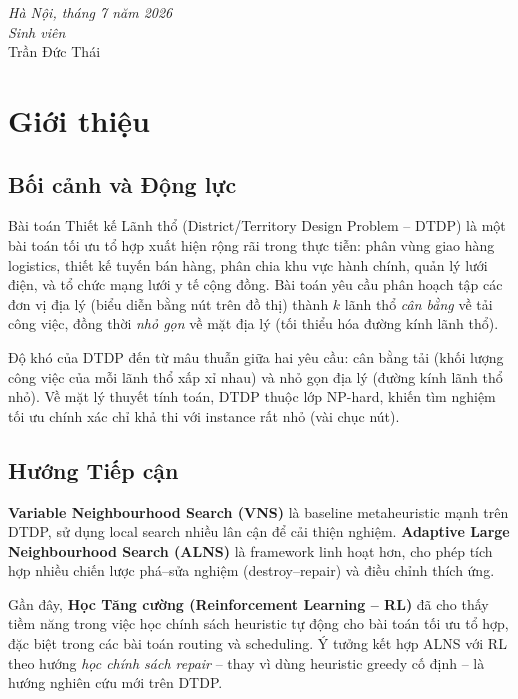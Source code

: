\documentclass[12pt, a4paper]{article}
\begin{document}
\vspace{1cm}
\begin{flushright}
  \textit{Hà Nội, tháng 7 năm 2026}\\[0.3cm]
  \textit{Sinh viên}\\[0.5cm]
  Trần Đức Thái
\end{flushright}

\newpage
\tableofcontents
\newpage

\section{Giới thiệu}
\label{sec:intro}

\subsection{Bối cảnh và Động lực}

Bài toán Thiết kế Lãnh thổ (District/Territory Design Problem -- DTDP) là một
bài toán tối ưu tổ hợp xuất hiện rộng rãi trong thực tiễn: phân vùng giao hàng
logistics, thiết kế tuyến bán hàng, phân chia khu vực hành chính, quản lý lưới
điện, và tổ chức mạng lưới y tế cộng đồng.
Bài toán yêu cầu phân hoạch tập các đơn vị địa lý (biểu diễn bằng nút trên đồ thị)
thành $k$ lãnh thổ \emph{cân bằng} về tải công việc, đồng thời \emph{nhỏ gọn}
về mặt địa lý (tối thiểu hóa đường kính lãnh thổ).

Độ khó của DTDP đến từ mâu thuẫn giữa hai yêu cầu: cân bằng tải (khối lượng công
việc của mỗi lãnh thổ xấp xỉ nhau) và nhỏ gọn địa lý (đường kính lãnh thổ nhỏ).
Về mặt lý thuyết tính toán, DTDP thuộc lớp NP-hard, khiến tìm nghiệm tối ưu
chính xác chỉ khả thi với instance rất nhỏ (vài chục nút).

\subsection{Hướng Tiếp cận}

\textbf{Variable Neighbourhood Search (VNS)} là baseline metaheuristic mạnh
trên DTDP, sử dụng local search nhiều lân cận để cải thiện nghiệm.
\textbf{Adaptive Large Neighbourhood Search (ALNS)} là framework linh hoạt hơn,
cho phép tích hợp nhiều chiến lược phá--sửa nghiệm (destroy--repair) và điều
chỉnh thích ứng.

Gần đây, \textbf{Học Tăng cường (Reinforcement Learning -- RL)} đã cho thấy tiềm
năng trong việc học chính sách heuristic tự động cho bài toán tối ưu tổ hợp,
đặc biệt trong các bài toán routing và scheduling.
Ý tưởng kết hợp ALNS với RL theo hướng \emph{học chính sách repair} -- thay vì
dùng heuristic greedy cố định -- là hướng nghiên cứu mới trên DTDP.
\end{document}
